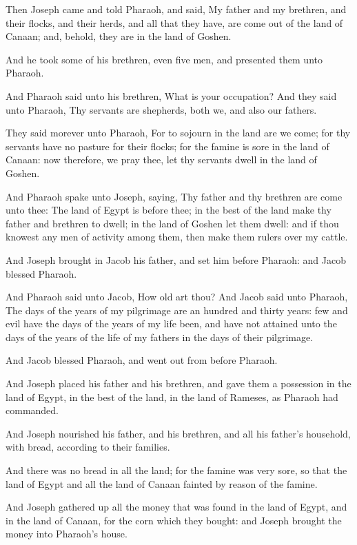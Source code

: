 \Chapter
\Verse Then Joseph came and told Pharaoh, and said, My father and my brethren, and their flocks, and their herds, and all that they have, are come out of the land of Canaan; and, behold, they are in the land of Goshen.

\Verse And he took some of his brethren, even five men, and presented them unto Pharaoh.

\Verse And Pharaoh said unto his brethren, What is your occupation? And they said unto Pharaoh, Thy servants are shepherds, both we, and also our fathers.

\Verse They said morever unto Pharaoh, For to sojourn in the land are we come; for thy servants have no pasture for their flocks; for the famine is sore in the land of Canaan: now therefore, we pray thee, let thy servants dwell in the land of Goshen.

\Verse And Pharaoh spake unto Joseph, saying, Thy father and thy brethren are come unto thee: \Verse The land of Egypt is before thee; in the best of the land make thy father and brethren to dwell; in the land of Goshen let them dwell: and if thou knowest any men of activity among them, then make them rulers over my cattle.

\Verse And Joseph brought in Jacob his father, and set him before Pharaoh: and Jacob blessed Pharaoh.

\Verse And Pharaoh said unto Jacob, How old art thou?  \Verse And Jacob said unto Pharaoh, The days of the years of my pilgrimage are an hundred and thirty years: few and evil have the days of the years of my life been, and have not attained unto the days of the years of the life of my fathers in the days of their pilgrimage.

\Verse And Jacob blessed Pharaoh, and went out from before Pharaoh.

\Verse And Joseph placed his father and his brethren, and gave them a possession in the land of Egypt, in the best of the land, in the land of Rameses, as Pharaoh had commanded.

\Verse And Joseph nourished his father, and his brethren, and all his father's household, with bread, according to their families.

\Verse And there was no bread in all the land; for the famine was very sore, so that the land of Egypt and all the land of Canaan fainted by reason of the famine.

\Verse And Joseph gathered up all the money that was found in the land of Egypt, and in the land of Canaan, for the corn which they bought: and Joseph brought the money into Pharaoh's house.

